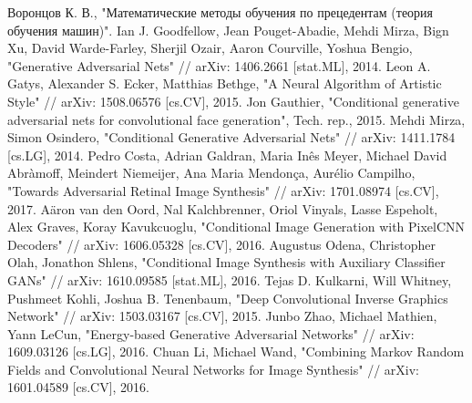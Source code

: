 \documentclass[a4paper]{article}
\begin{document}
	\renewcommand\refname{\centering СПИСОК ИСПОЛЬЗОВАННЫХ ИСТОЧНИКОВ}
	
	\setcounter{page}{2}
	\tableofcontents
	
	
	
	
	
	
	
	
	
	
	\begin{thebibliography}{99}
		  Воронцов К. В., "Математические методы обучения по прецедентам (теория обучения машин)".
		 Ian J. Goodfellow, Jean Pouget-Abadie, Mehdi Mirza, Bign Xu, David Warde-Farley, Sherjil Ozair, Aaron Courville, Yoshua Bengio, "Generative Adversarial Nets" // arXiv: 1406.2661 [stat.ML], 2014.
		 Leon A. Gatys, Alexander S. Ecker, Matthias Bethge, "A Neural Algorithm of Artistic Style" // arXiv: 1508.06576 [cs.CV], 2015.
		 Jon Gauthier, "Conditional generative adversarial nets for convolutional face generation", Tech. rep., 2015.
		 Mehdi Mirza, Simon Osindero, "Conditional Generative Adversarial Nets" // arXiv: 1411.1784 [cs.LG], 2014.
		 Pedro Costa, Adrian Galdran, Maria Inês Meyer, Michael David Abràmoff, Meindert Niemeijer, Ana Maria Mendonça, Aurélio Campilho, "Towards Adversarial Retinal Image Synthesis" // arXiv: 1701.08974 [cs.CV], 2017.
		 A\"aron van den Oord, Nal Kalchbrenner, Oriol Vinyals, Lasse Espeholt, Alex Graves, Koray Kavukcuoglu, "Conditional Image Generation with PixelCNN Decoders" // arXiv: 1606.05328 [cs.CV], 2016.
		 Augustus Odena, Christopher Olah, Jonathon Shlens, "Conditional Image Synthesis with Auxiliary Classifier GANs" // arXiv: 1610.09585 [stat.ML], 2016.
		 Tejas D. Kulkarni, Will Whitney, Pushmeet Kohli, Joshua B. Tenenbaum, "Deep Convolutional Inverse Graphics Network" // arXiv: 1503.03167 [cs.CV], 2015.
		 Junbo Zhao, Michael Mathien, Yann LeCun, "Energy-based Generative Adversarial Networks" // arXiv: 1609.03126 [cs.LG], 2016.
		 Chuan Li, Michael Wand, "Combining Markov Random Fields and Convolutional Neural Networks for Image Synthesis" // arXiv: 1601.04589 [cs.CV], 2016.

\end{thebibliography}
\end{document}
